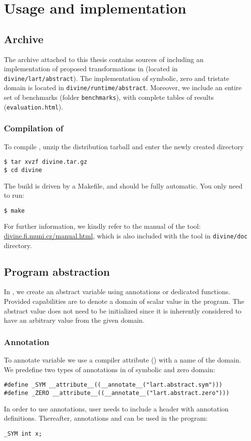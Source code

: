 \chapter{Usage and implementation}\label{ch:appendixb}

\section{Archive}

The archive attached to this thesis contains sources of \DIVINE including an
implementation of proposed transformations in \LART (located in
\texttt{divine/lart/abstract}). The implementation of symbolic, zero and
tristate domain is located in \texttt{divine/runtime/abstract}. Moreover, we
include an entire set of benchmarks (folder \texttt{benchmarks}), with complete
tables of results (\texttt{evaluation.html}).

\subsection{Compilation of \DIVINE}
To compile \DIVINE, unzip the distribution tarball and enter the
newly created directory
\begin{verbatim}
$ tar xvzf divine.tar.gz
$ cd divine
\end{verbatim}
The build is driven by a Makefile, and should be fully automatic. You only need to run:
\begin{verbatim}
$ make
\end{verbatim}
For further information, we kindly refer to the manual of the tool:
\url{divine.fi.muni.cz/manual.html}, which is also inclu\-ded with the tool
in \texttt{divine/doc} directory.

\section{Program abstraction}
In \DIVINE, we create an abstract variable using annotations or dedicated
functions. Provided capabilities are to denote a domain of scalar value in the
program. The abstract value does not need to be initialized since it is
inherently considered to have an arbitrary value from the given domain.

\subsection{Annotation}

To annotate variable we use a compiler attribute () with
a name of the domain. We predefine two types of annotations in
 of symbolic and zero domain:
\begin{verbatim}
#define _SYM __attribute__((__annotate__("lart.abstract.sym")))
#define _ZERO __attribute__((__annotate__("lart.abstract.zero")))
\end{verbatim}
In order to use annotations, user needs to include a header with annotation
definitions. Thereafter, annotations  and  can be used in
the program:
\begin{verbatim}
_SYM int x;
\end{verbatim}

